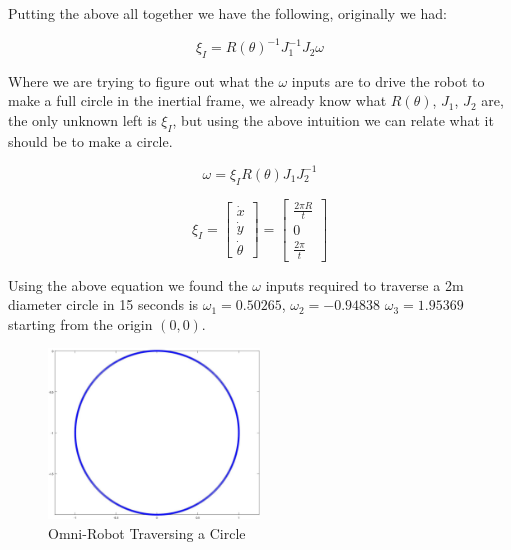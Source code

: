 \documentclass{article}
\begin{document}
Putting the above all together we have the following, originally we had:

\begin{equation}
    \xi_{I} = R(\theta)^{-1} J_{1}^{-1} J_{2} \omega
\end{equation}

Where we are trying to figure out what the $\omega$ inputs are to drive the 
robot to make a full circle in the inertial frame, we already know what 
$R(\theta)$, $J_{1}$, $J_{2}$ are, the only unknown left is $\xi_{I}$, but 
using the above intuition we can relate what it should be to make a circle.

\begin{equation}
    \omega = \xi_{I} R(\theta) J_{1} J_{2}^{-1}
\end{equation}

\begin{equation}
    \xi_{I} =
  		\begin{bmatrix}
            \dot{x} \\
            \dot{y} \\
            \dot{\theta}
        \end{bmatrix} 
        =
  		\begin{bmatrix}
            \frac{2 \pi R}{t} \\
            0 \\
            \frac{2 \pi}{t}
        \end{bmatrix}
\end{equation}

Using the above equation we found the $\omega$ inputs required to traverse a 
2m diameter circle in 15 seconds is $\omega_{1} = 0.50265$, $\omega_{2} = 
-0.94838$ $\omega_{3} = 1.95369$ starting from the origin $(0, 0)$.

\begin{figure}[H]
	\centering
	\includegraphics[width=0.5\textwidth]{images/traverse_circle.jpg}
	\caption{Omni-Robot Traversing a Circle}
	\label{fig:omni_robot_circle}
\end{figure}
\end{document}
